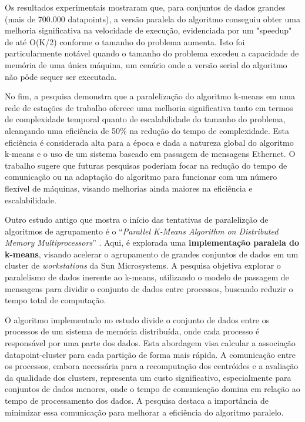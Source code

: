 \documentclass[12pt,
openright, 
oneside, %
a4paper,    %
brazil]{facom-ufu-abntex2}
\begin{document}
Os resultados experimentais mostraram que, para conjuntos de dados grandes (mais de 700.000 datapoints), a versão paralela do algoritmo conseguiu obter uma melhoria significativa na velocidade de execução, evidenciada por um "speedup" de até O(K/2) conforme o tamanho do problema aumenta. Isto foi particularmente notável quando o tamanho do problema excedeu a capacidade de memória de uma única máquina, um cenário onde a versão serial do algoritmo não pôde sequer ser executada.

No fim, a pesquisa demonstra que a paralelização do algoritmo k-means em uma rede de estações de trabalho oferece uma melhoria significativa tanto em termos de complexidade temporal quanto de escalabilidade do tamanho do problema, alcançando uma eficiência de 50\% na redução do tempo de complexidade. Esta eficiência é considerada alta para a época e dada a natureza global do algoritmo k-means e o uso de um sistema baseado em passagem de mensagens Ethernet. O trabalho sugere que futuras pesquisas poderiam focar na redução do tempo de comunicação ou na adaptação do algoritmo para funcionar com um número flexível de máquinas, visando melhorias ainda maiores na eficiência e escalabilidade.

Outro estudo antigo que mostra o início das tentativas de paralelizção de algoritmos de agrupamento é o \enquote{\textit{Parallel K-Means Algorithm on Distributed Memory Multiprocessors}} \cite{parallelKMeansJoshi2003}. Aqui, é explorada uma \textbf{implementação paralela do k-means}, visando acelerar o agrupamento de grandes conjuntos de dados em um cluster de \textit{workstations} da Sun Microsystems. A pesquisa objetiva explorar o paralelismo de dados inerente ao k-means, utilizando o modelo de passagem de mensagens para dividir o conjunto de dados entre processos, buscando reduzir o tempo total de computação.

O algoritmo implementado no estudo divide o conjunto de dados entre os processos de um sistema de memória distribuída, onde cada processo é responsável por uma parte dos dados. Esta abordagem visa calcular a associação datapoint-cluster para cada partição de forma mais rápida. A comunicação entre os processos, embora necessária para a recomputação dos centróides e a avaliação da qualidade dos clusters, representa um custo significativo, especialmente para conjuntos de dados menores, onde o tempo de comunicação domina em relação ao tempo de processamento dos dados. A pesquisa destaca a importância de minimizar essa comunicação para melhorar a eficiência do algoritmo paralelo.
\end{document}
